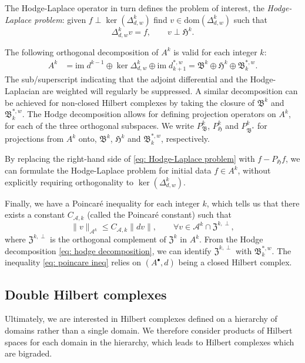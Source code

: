 \documentclass[reqno]{amsart}
\numberwithin{equation}{section}
\theoremstyle{definition}
\newcommand{\Ac}{\mathcal{A}}
\newcommand{\Hf}{\mathfrak{H}}
\newcommand{\Bf}{\mathfrak{B}}
\newcommand{\Zf}{\mathfrak{Z}}
\newcommand{\dom}{\mathrm{dom}}
\begin{document}
The Hodge-Laplace operator in turn defines the problem of interest, the \emph{Hodge-Laplace problem}: given $f \perp \ker(\Delta_{d,w}^k)$ find $v \in \dom(\Delta_{d,w}^k)$ such that
\begin{equation}\label{eq: Hodge-Laplace problem}
\Delta_{d,w}^k v = f, \qquad v \perp \Hf^k.
\end{equation}

The following orthogonal decomposition of $A^k$ is valid for each integer $k$:
\begin{align}\label{eq: hodge decomposition}
A^k &= \mathrm{im \;} d^{k-1} \oplus \ker \Delta_{d,w}^k \oplus \mathrm{im \;} d^{*,w}_{k+1} = \mathfrak{B}^k \oplus \mathfrak{H}^k \oplus \mathfrak{B}^{*,w}_k.
\end{align}
The sub/superscript indicating that the adjoint differential and the Hodge-Laplacian are weighted will regularly be suppressed. A similar decomposition can be achieved for non-closed Hilbert complexes by taking the closure of $\Bf^k$ and $\Bf^{*,w}_k$. The Hodge decomposition allows for defining projection operators on $A^k$, for each of the three orthogonal subspaces. We write $P_\Bf^k$, $P_\Hf^k$ and $P_{\Bf^*}^k$ for projections from $A^k$ onto, $\Bf^k$, $\Hf^k$ and $\Bf^{*,w}_k$, respectively.

By replacing the right-hand side of \cref{eq: Hodge-Laplace problem} with $f - P_\Hf f$, we can formulate the Hodge-Laplace problem for initial data $f \in A^k$, without explicitly requiring orthogonality to $\ker(\Delta_{d,w}^k)$.

Finally, we have a Poincaré inequality for each integer $k$, which tells us that there exists a constant $C_{\Ac, k}$ (called the Poincaré constant) such that
\begin{equation}\label{eq: poincare ineq}
\|v\|_{\Ac^k} \leq C_{\Ac, k} \|dv\|, \qquad \forall  v \in \Ac^k \cap \Zf^{k, \perp},
\end{equation}
where $\Zf^{k, \perp}$ is the orthogonal complement of $\Zf^k$ in $A^k$. From the Hodge decomposition \cref{eq: hodge decomposition}, we can identify $\Zf^{k,\perp}$ with $\mathfrak{B}^{*,w}_k$. The inequality \cref{eq: poincare ineq} relies on $(A^\bullet, d)$ being a closed Hilbert complex. 


\subsection{Double Hilbert complexes}
Ultimately, we are interested in Hilbert complexes defined on a hierarchy of domains rather than a single domain. We therefore consider products of Hilbert spaces for each domain in the hierarchy, which leads to Hilbert complexes which are bigraded.
\end{document}

